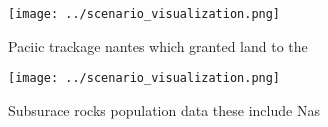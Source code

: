 \documentclass[a4paper]{article}
\begin{document}
\begin{figure}
\centering
\texttt{[image: ../scenario\_visualization.png]}
\caption{Paciic trackage nantes which granted land to the 
}
\end{figure}
 
\begin{figure}
\centering
\texttt{[image: ../scenario\_visualization.png]}
\caption{Subsurace rocks population data these include Nas
}
\end{figure}
 
\end{document}
